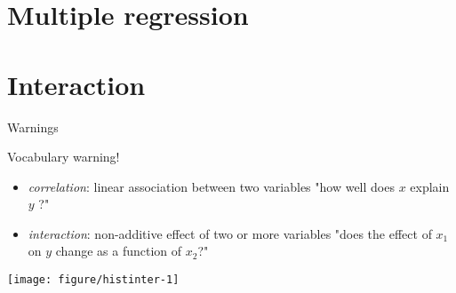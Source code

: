 \documentclass[10pt]{beamer}\usepackage[]{graphicx}\usepackage[]{color}
\newenvironment{knitrout}{}{} %
\begin{document}
\section{Multiple regression}


\section{Interaction}

\begin{frame}[fragile]{Warnings}

  \begin{alertblock}{Vocabulary warning!}
    \begin{itemize}[<+->]
      \item \textit{correlation}: linear association between two variables "how well does $x$ explain $y$ ?"
      \item \textit{interaction}: non-additive effect of two or more variables "does the effect of $x_1$ on $y$ change as a function of $x_2$?"
    \end{itemize}
  \end{alertblock}

\pause 
\begin{knitrout}\small
{}\color{fgcolor}
\texttt{[image: figure/histinter-1]} 

\end{knitrout}
\end{frame}
\end{document}

